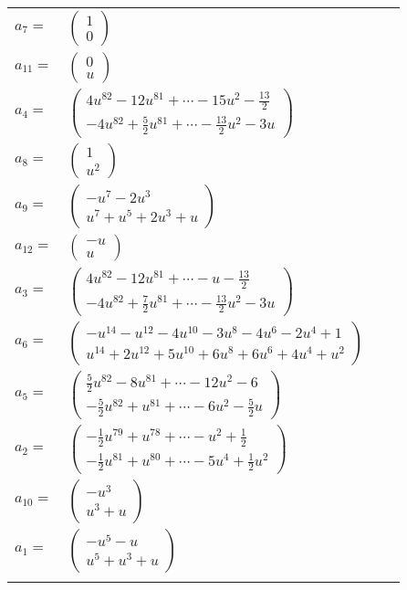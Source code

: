 \documentclass[1p]{elsarticle_modified}
\theoremstyle{definition}
\begin{document}
\begin{tabular}{m{7pt} m{180pt} m{7pt} m{180pt} }
\flushright $a_{7}=$&$\begin{pmatrix}1\\0\end{pmatrix}$ \\
\flushright $a_{11}=$&$\begin{pmatrix}0\\u\end{pmatrix}$ \\
\flushright $a_{4}=$&$\begin{pmatrix}4 u^{82}-12 u^{81}+\cdots-15 u^2-\frac{13}{2}\\-4 u^{82}+\frac{5}{2} u^{81}+\cdots-\frac{13}{2} u^2-3 u\end{pmatrix}$ \\
\flushright $a_{8}=$&$\begin{pmatrix}1\\u^2\end{pmatrix}$ \\
\flushright $a_{9}=$&$\begin{pmatrix}- u^7-2 u^3\\u^7+u^5+2 u^3+u\end{pmatrix}$ \\
\flushright $a_{12}=$&$\begin{pmatrix}- u\\u\end{pmatrix}$ \\
\flushright $a_{3}=$&$\begin{pmatrix}4 u^{82}-12 u^{81}+\cdots- u-\frac{13}{2}\\-4 u^{82}+\frac{7}{2} u^{81}+\cdots-\frac{13}{2} u^2-3 u\end{pmatrix}$ \\
\flushright $a_{6}=$&$\begin{pmatrix}- u^{14}- u^{12}-4 u^{10}-3 u^8-4 u^6-2 u^4+1\\u^{14}+2 u^{12}+5 u^{10}+6 u^8+6 u^6+4 u^4+u^2\end{pmatrix}$ \\
\flushright $a_{5}=$&$\begin{pmatrix}\frac{5}{2} u^{82}-8 u^{81}+\cdots-12 u^2-6\\-\frac{5}{2} u^{82}+u^{81}+\cdots-6 u^2-\frac{5}{2} u\end{pmatrix}$ \\
\flushright $a_{2}=$&$\begin{pmatrix}-\frac{1}{2} u^{79}+u^{78}+\cdots- u^2+\frac{1}{2}\\-\frac{1}{2} u^{81}+u^{80}+\cdots-5 u^4+\frac{1}{2} u^2\end{pmatrix}$ \\
\flushright $a_{10}=$&$\begin{pmatrix}- u^3\\u^3+u\end{pmatrix}$ \\
\flushright $a_{1}=$&$\begin{pmatrix}- u^5- u\\u^5+u^3+u\end{pmatrix}$\\&\end{tabular}
\end{document}
